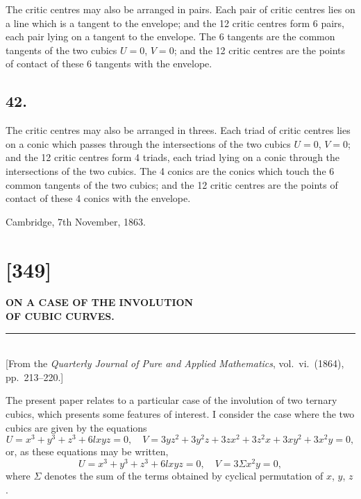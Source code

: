 \documentclass[11pt,a4paper]{article}
\theoremstyle{definition}
\begin{document}
The critic centres may also be arranged in pairs. Each pair of critic centres lies on
a line which is a tangent to the envelope; and the 12 critic centres form 6 pairs, each
pair lying on a tangent to the envelope. The 6 tangents are the common tangents of the
two cubics $U = 0$, $V = 0$; and the 12 critic centres are the points of contact of these 6
tangents with the envelope.

\subsection*{42.}

The critic centres may also be arranged in threes. Each triad of critic centres lies on
a conic which passes through the intersections of the two cubics $U = 0$, $V = 0$; and the
12 critic centres form 4 triads, each triad lying on a conic through the intersections of
the two cubics. The 4 conics are the conics which touch the 6 common tangents of the
two cubics; and the 12 critic centres are the points of contact of these 4 conics with the
envelope.

\vspace{1em}
\noindent
Cambridge, 7th November, 1863.

\newpage
\section*{[349]}

\begin{center}
{\large\bfseries ON A CASE OF THE INVOLUTION}\\[4pt]
{\large\bfseries OF CUBIC CURVES.}\\[8pt]
\rule{0.5\textwidth}{0.4pt}\\[6pt]
{\small [From the \textit{Quarterly Journal of Pure and Applied Mathematics}, vol.~vi.\ (1864),}\\
{\small pp.~213--220.]}
\end{center}

\vspace{0.5em}

The present paper relates to a particular case of the involution of two ternary cubics,
which presents some features of interest. I consider the case where the two cubics are
given by the equations
\[
U = x^{3} + y^{3} + z^{3} + 6lxyz = 0,\quad V = 3yz^{2} + 3y^{2}z + 3zx^{2} + 3z^{2}x + 3xy^{2} + 3x^{2}y = 0,
\]
or, as these equations may be written,
\[
U = x^{3} + y^{3} + z^{3} + 6lxyz = 0,\quad V = 3\Sigma x^{2}y = 0,
\]
where $\Sigma$ denotes the sum of the terms obtained by cyclical permutation of $x$, $y$, $z$.
\end{document}
